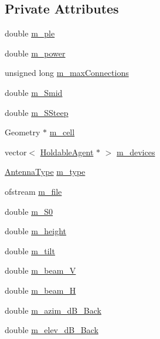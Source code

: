 \subsection*{Private Attributes}
\begin{DoxyCompactItemize}
\item 
double \mbox{\hyperlink{class_antenna_a13b5973d4050a704682d65036acca851}{m\+\_\+ple}}
\item 
double \mbox{\hyperlink{class_antenna_a89874a2fbd083c99f780482bf4642b07}{m\+\_\+power}}
\item 
unsigned long \mbox{\hyperlink{class_antenna_a06480ddd6e9a9cb4d88c4cea72e2d2ab}{m\+\_\+max\+Connections}}
\item 
double \mbox{\hyperlink{class_antenna_ae5f536b16d9d924a7ee7cba954c44d05}{m\+\_\+\+Smid}}
\item 
double \mbox{\hyperlink{class_antenna_a48117d47d70c758f5a09c54fa323feed}{m\+\_\+\+S\+Steep}}
\item 
Geometry $\ast$ \mbox{\hyperlink{class_antenna_addbe8e6ae7a8bad737339d23bc2abbba}{m\+\_\+cell}}
\item 
vector$<$ \mbox{\hyperlink{class_holdable_agent}{Holdable\+Agent}} $\ast$ $>$ \mbox{\hyperlink{class_antenna_a2d0f7032eb1d8cc6c02b1dd64bc59856}{m\+\_\+devices}}
\item 
\mbox{\hyperlink{_antenna_type_8h_a7b678b5cb9dedc607131200119d96b16}{Antenna\+Type}} \mbox{\hyperlink{class_antenna_a6b68373c8b139e8dafc4c11480eee0e1}{m\+\_\+type}}
\item 
ofstream \mbox{\hyperlink{class_antenna_a06824840191e96b19eb224d53e08d3ec}{m\+\_\+file}}
\item 
double \mbox{\hyperlink{class_antenna_a65bdd3ec77862b9427df42ae74dc54e4}{m\+\_\+\+S0}}
\item 
double \mbox{\hyperlink{class_antenna_a0fca07a2514679c814009730d966b2a3}{m\+\_\+height}}
\item 
double \mbox{\hyperlink{class_antenna_a039d6c95ae3a5e9d4973f647783062de}{m\+\_\+tilt}}
\item 
double \mbox{\hyperlink{class_antenna_a330f54f4d7344094bf137cabf2756112}{m\+\_\+beam\+\_\+V}}
\item 
double \mbox{\hyperlink{class_antenna_a9174c6dd20682cea4eccea7c7d6ffee7}{m\+\_\+beam\+\_\+H}}
\item 
double \mbox{\hyperlink{class_antenna_aa7ed7c0424dfd20193b550a4ececcb64}{m\+\_\+azim\+\_\+d\+B\+\_\+\+Back}}
\item 
double \mbox{\hyperlink{class_antenna_a4bea419f24f40b37cfd784e61a01aec7}{m\+\_\+elev\+\_\+d\+B\+\_\+\+Back}}

\end{DoxyCompactItemize}
